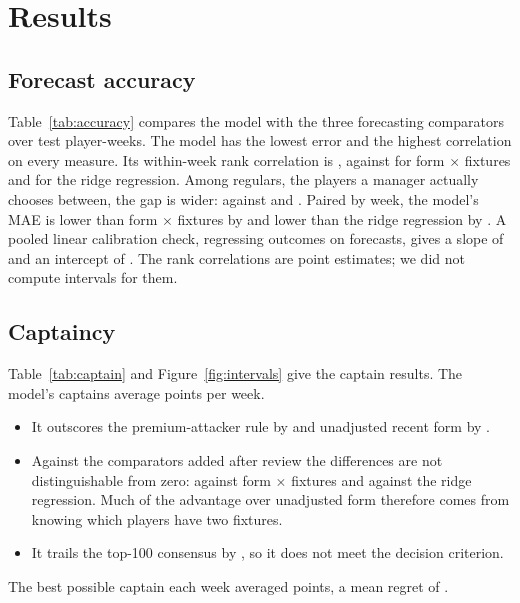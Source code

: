 \documentclass[11pt,a4paper]{article}
\begin{document}
\section{Results}

\subsection{Forecast accuracy}
Table~\ref{tab:accuracy} compares the model with the three forecasting comparators over
\nTestRows{} test player-weeks. The model has the lowest error and the highest correlation on
every measure. Its within-week rank correlation is \rhoModel{}, against \rhoForm{} for form
$\times$ fixtures and \rhoReg{} for the ridge regression. Among regulars, the players a manager
actually chooses between, the gap is wider: \rhoCandModel{} against \rhoCandForm{} and
\rhoCandReg{}. Paired by week, the model's MAE is lower than form $\times$ fixtures by
\maeGainFormScaled{} and lower than the ridge regression by \maeGainReg{}. A pooled linear
calibration check, regressing outcomes on forecasts, gives a slope of \calSlope{} and an intercept
of \calIntercept{}. The rank correlations are point estimates; we did not compute intervals for
them.

\begin{table}[ht]
\centering
\small
\caption{Forecast accuracy over all test player-weeks with a fixture, and among regulars
(\nCandRows{} player-weeks). Weekly rank is the mean within-week Spearman correlation.}
\label{tab:accuracy}

\end{table}

\subsection{Captaincy}
Table~\ref{tab:captain} and Figure~\ref{fig:intervals} give the captain results. The model's
captains average \capModel{} points per week.
\begin{itemize}
  \item It outscores the premium-attacker rule by \vsPremium{} and unadjusted recent form by
        \vsForm{}.
  \item Against the comparators added after review the differences are not distinguishable from
        zero: \vsFormScaled{} against form $\times$ fixtures and \vsReg{} against the ridge
        regression. Much of the advantage over unadjusted form therefore comes from knowing which
        players have two fixtures.
  \item It trails the top-100 consensus by \vsElite{}, so it does not meet the decision criterion.
\end{itemize}
The best possible captain each week averaged \capBest{} points, a mean regret of \capRegret{}.
\end{document}
